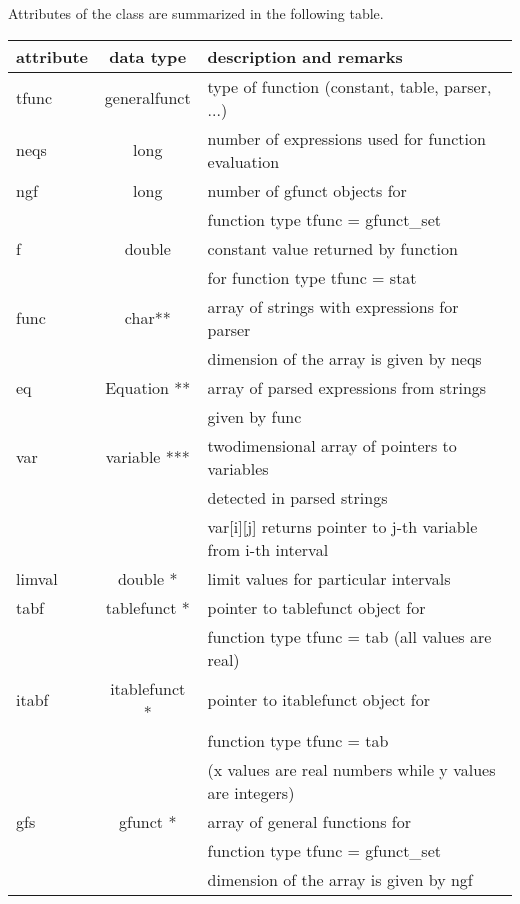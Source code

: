Attributes of the class are summarized in the following table.
\begin{center}
\begin{tabular}{|l|c|l|}
\hline
attribute & data type & description and remarks
\\ \hline \hline
{\sf tfunc} & {\sf generalfunct} & type of function (constant, table, parser, ...)
\\ \hline
{\sf neqs} & {\sf long} & number of expressions used for function evaluation
\\ \hline
{\sf ngf} & {\sf long} & number of gfunct objects for \\
         &            & function type {\sf tfunc = gfunct\_set}
\\ \hline
{\sf f} & {\sf double} & constant value returned by function\\
       &               & for function type {\sf tfunc = stat}
\\ \hline
{\sf func} & {\sf char**} & array of strings with expressions for parser\\
       &               & dimension of the array is given by {\sf neqs}
\\ \hline
{\sf eq} & {\sf Equation **} & array of parsed expressions from strings \\
        &                   & given by {\sf func}
\\ \hline
{\sf var} & {\sf variable ***} & twodimensional array of pointers to variables\\
         &                    & detected in parsed strings\\
         &                    & {\sf var[i][j]} returns pointer to {\sf j}-th variable from {\sf i}-th interval
\\ \hline
{\sf limval} & {\sf double *}   & limit values for particular intervals
\\ \hline
{\sf tabf} & {\sf tablefunct *}  & pointer to {\sf tablefunct} object for\\
         &                     & function type {\sf tfunc = tab} (all values are real)
\\ \hline
{\sf itabf} & {\sf itablefunct *}   & pointer to {\sf itablefunct} object for\\
         &                     & function type {\sf tfunc = tab} \\
         &                     & (x values are real numbers while y values are integers)
\\ \hline
{\sf gfs} & {\sf gfunct *}      & array of general functions for\\
         &                     & function type {\sf tfunc = gfunct\_set} \\
         &                     & dimension of the array is given by {\sf ngf}
\\ \hline
\end{tabular}
\end{center}

